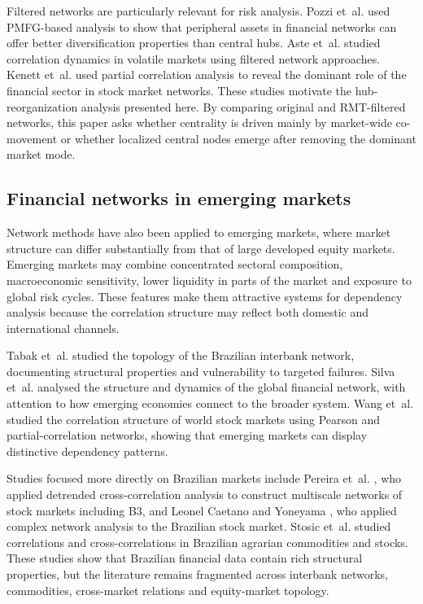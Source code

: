 Filtered networks are particularly relevant for risk analysis. Pozzi et~al. \cite{pozzi_2013_spread} used PMFG-based analysis to show that peripheral assets in financial networks can offer better diversification properties than central hubs. Aste et~al. \cite{aste_2010_correlation} studied correlation dynamics in volatile markets using filtered network approaches. Kenett et~al. \cite{kenett_2012_dominating} used partial correlation analysis to reveal the dominant role of the financial sector in stock market networks. These studies motivate the hub-reorganization analysis presented here. By comparing original and RMT-filtered networks, this paper asks whether centrality is driven mainly by market-wide co-movement or whether localized central nodes emerge after removing the dominant market mode.

\subsection{Financial networks in emerging markets}

Network methods have also been applied to emerging markets, where market structure can differ substantially from that of large developed equity markets. Emerging markets may combine concentrated sectoral composition, macroeconomic sensitivity, lower liquidity in parts of the market and exposure to global risk cycles. These features make them attractive systems for dependency analysis because the correlation structure may reflect both domestic and international channels.

Tabak et~al. \cite{tabak_2010_topology} studied the topology of the Brazilian interbank network, documenting structural properties and vulnerability to targeted failures. Silva et~al. \cite{silva_2016_structure} analysed the structure and dynamics of the global financial network, with attention to how emerging economies connect to the broader system. Wang et~al. \cite{wang_2018_correlation} studied the correlation structure of world stock markets using Pearson and partial-correlation networks, showing that emerging markets can display distinctive dependency patterns.

Studies focused more directly on Brazilian markets include Pereira et~al. \cite{pereira_2019_multiscale}, who applied detrended cross-correlation analysis to construct multiscale networks of stock markets including B3, and Leonel Caetano and Yoneyama \cite{leonel_2022_brazilian}, who applied complex network analysis to the Brazilian stock market. Stosic et~al. \cite{stosic_2015_correlations} studied correlations and cross-correlations in Brazilian agrarian commodities and stocks. These studies show that Brazilian financial data contain rich structural properties, but the literature remains fragmented across interbank networks, commodities, cross-market relations and equity-market topology.

